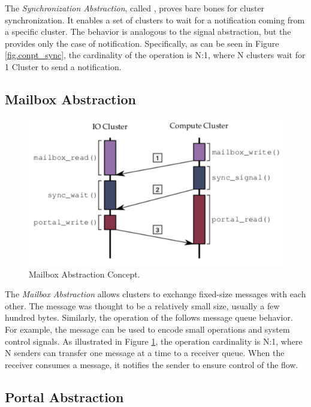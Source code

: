 			The \textit{Synchronization Abstraction}, called \sync, proves bare bones
			for cluster synchronization.
			It enables a set of clusters to wait for a notification coming from a
			specific cluster.
			The behavior is analogous to the \posix signal abstraction, but the \sync
			provides only the case of notification.
			Specifically, as can be seen in Figure \ref{fig.conpt_sync}, the
			cardinality of the operation is N:1, where N clusters wait for 1 Cluster
			to send a notification.

		\subsection{Mailbox Abstraction}
		\label{sec.mailbox-abs}

			\begin{figure}[h]
				\centering
				\includegraphics[width=.7\textwidth]{images/conceptual-sync.png}

				\caption{
					Mailbox Abstraction Concept.
				}\par
				\label{fig.conpt_mailbox}
			\end{figure}

			The \textit{Mailbox Abstraction} allows clusters to exchange fixed-size
			messages with each other.
			The message was thought to be a relatively small size, usually a few hundred bytes.
			Similarly, the operation of the \mailbox follows \posix message queue behavior.
			For example, the message can be used to encode small operations and system
			control signals.
			As illustrated in Figure \ref{fig.conpt_mailbox}, the operation cardinality is N:1,
			where N senders can transfer one message at a time to a receiver queue.
			When the receiver consumes a message, it notifies the sender to ensure
			control of the flow.

		\subsection{Portal Abstraction}
		\label{sec.portal-abs}

